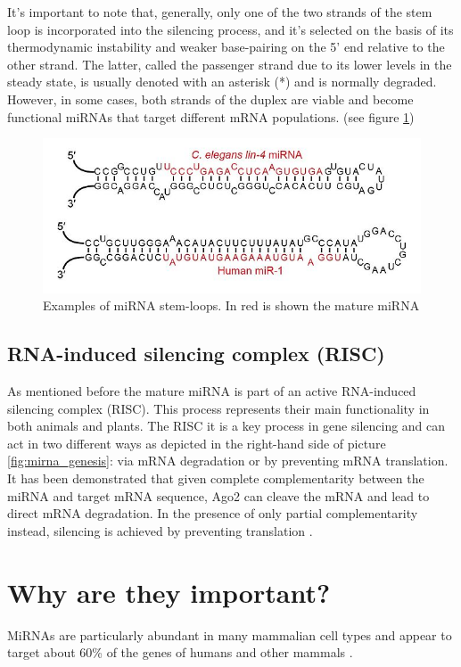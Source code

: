 It's important to note that, generally, only one of the two strands of the stem loop is incorporated into the silencing process, and it's selected on the basis of its thermodynamic instability and weaker base-pairing on the 5' end relative to the other strand. The latter, called the passenger strand due to its lower levels in the steady state, is usually denoted with an asterisk (*) and is normally degraded. However, in some cases, both strands of the duplex are viable and become functional miRNAs that target different mRNA populations. (see figure \ref{fig:mirna_stems})

\begin{figure}[hbt!]
	\centering
	\includegraphics[width=1.0\textwidth]{Figures/mirna_stems}
	\caption{Examples of miRNA stem-loops. In red is shown the mature miRNA}
	\label{fig:mirna_stems}
\end{figure}

\subsection{RNA-induced silencing complex (RISC)}
As mentioned before the mature miRNA is part of an active RNA-induced silencing complex (RISC). This process represents their main functionality in both animals and plants. 
The RISC it is a key process in gene silencing and can act in two different ways as depicted in the right-hand side of picture \ref{fig:mirna_genesis}: via mRNA degradation or by preventing mRNA translation. It has been demonstrated that given complete complementarity between the miRNA and target mRNA sequence, Ago2 can cleave the mRNA and lead to direct mRNA degradation. In the presence of only partial complementarity instead, silencing is achieved by preventing translation \cite{cleavage}.
 

\section{Why are they important?}
MiRNAs are particularly abundant in many mammalian cell types and appear to target about 60\% of the genes of humans and other mammals \cite{conserved_pairing}.

